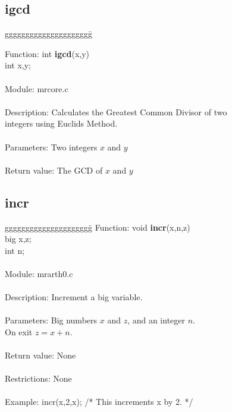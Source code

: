 \subsection{igcd}

\begin{tabbing}
ggggggggggggggggggggg\= \kill

      Function:      \>int {\bf igcd}(x,y) \\
                     \>int x,y; \\
      \ \\
      Module:        \>mrcore.c \\
      \ \\
      Description:   \>Calculates the Greatest Common Divisor of two  \\
                     \>integers using Euclids Method. \\
      \ \\
      Parameters:    \>Two integers $x$ and $y$   \\
      \ \\
      Return value:  \>The GCD of $x$ and $y$     \\

\end{tabbing}

\subsection{incr}
\begin{tabbing}
ggggggggggggggggggggg\= \kill
      Function:      \>void {\bf incr}(x,n,z) \\
                     \>big x,z; \\
                     \>int n; \\
      \ \\
      Module:        \>mrarth0.c \\
      \ \\
      Description:   \>Increment a big variable. \\
      \ \\
      Parameters:    \>Big numbers $x$ and $z$, and an integer $n$. \\
                     \>On exit $z=x+n$. \\
      \ \\
      Return value:  \>None \\
      \ \\
      Restrictions:  \>None  \\
      \ \\
      Example:       \>incr(x,2,x);  /* This increments x by 2. */ \\
\end{tabbing}
\pagebreak
